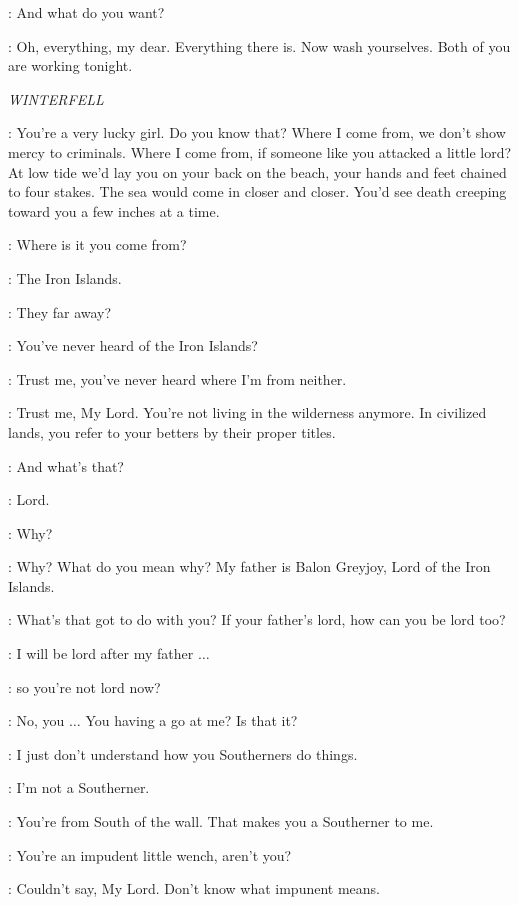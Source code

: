 \ROS: And what do you want? 

\LITTLEFINGER: Oh, everything, my dear. Everything there is. Now wash yourselves. Both of you are working tonight. 


\scene

\textit{WINTERFELL} 


\THEON: You're a very lucky girl. Do you know that? Where I come from, we don't show mercy to criminals.  Where I come from, if someone like you attacked a little lord? At low tide we'd lay you on your back on the beach, your hands and feet chained to four stakes.  The sea would come in closer and closer. You'd see death creeping toward you a few inches at a time. 

\OSHA: Where is it you come from? 

\THEON: The Iron Islands. 

\OSHA: They far away? 

\THEON: You've never heard of the Iron Islands? 

\OSHA: Trust me, you've never heard where I'm from neither. 

\THEON: Trust me, My Lord. You're not living in the wilderness anymore. In civilized lands, you refer to your betters by their proper titles. 

\OSHA: And what's that? 

\THEON: Lord. 

\OSHA: Why? 

\THEON: Why? What do you mean why? My father is Balon Greyjoy, Lord of the Iron Islands. 

\OSHA: What's that got to do with you? If your father's lord, how can you be lord too? 

\THEON: I will be lord after my father $\ldots$  

\OSHA: so you're not lord now? 

\THEON: No, you $\ldots$  You having a go at me? Is that it? 

\OSHA: I just don't understand how you Southerners do things. 

\THEON: I'm not a Southerner. 

\OSHA: You're from South of the wall. That makes you a Southerner to me. 

\THEON: You're an impudent little wench, aren't you? 

\OSHA: Couldn't say, My Lord. Don't know what impunent means. 

